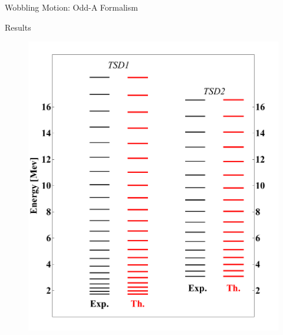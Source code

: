 \documentclass[final]{beamer}
\newlength{\colwidth}
\begin{document}
\begin{frame}[t]
\begin{columns}[t]
\begin{column}{\colwidth}
\begin{block}{Wobbling Motion: Odd-A Formalism}
  \end{block}
    \begin{block}{Results}
  \begin{figure}
\centering
\begin{minipage}{.5\textwidth}
  \centering
  \includegraphics[scale=0.8]{images/TSD-12.pdf}
\end{minipage}%
\begin{minipage}{.5\textwidth}
  \centering

\end{minipage}
\end{figure}
\end{block}
\end{column}
\end{columns}
\end{frame}
\end{document}
